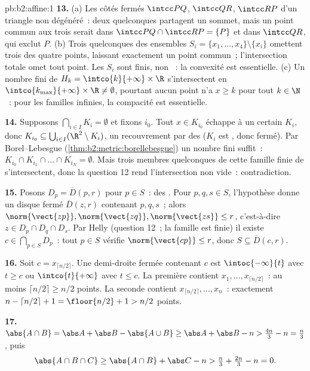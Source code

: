 \begin{solution}{pb:b2:affine:1}
\textbf{13.} (a) Les côtés fermés $\intcc PQ$, $\intcc QR$,
$\intcc RP$ d'un triangle non dégénéré~: deux quelconques partagent un
sommet, mais un point commun aux trois serait dans $\intcc
PQ \cap \intcc RP = \{P\}$ et dans $\intcc QR$, qui exclut
$P$. (b) Trois quelconques des ensembles $S_i = \{x_1, \dots, x_4\}
\setminus \{x_i\}$ omettent trois des quatre points, laissant
exactement un point commun~; l'intersection totale omet tout
point. Les $S_i$ sont finis, non ~: la convexité est
essentielle. (c) Un nombre fini de $H_k = \intco{k}{+\infty} \times
\R$ s'intersectent en $\intco{k_{\max}}{+\infty} \times \R \neq
\emptyset$, pourtant aucun point n'a $x \geq k$ pour tout $k \in \N$~:
pour les familles infinies, la compacité est essentielle.

\textbf{14.} Supposons $\bigcap_{i \in I}K_i = \emptyset$ et
fixons $i_0$. Tout $x \in K_{i_0}$ échappe à un certain $K_i$, donc
$K_{i_0} \subseteq \bigcup_{i \in I}(\R^2 \setminus K_i)$, un
recouvrement par des  ($K_i$ est , donc fermé). Par
Borel--Lebesgue (\cref{thm:b2:metric:borellebesgue}) un nombre fini
suffit~: $K_{i_0} \cap K_{i_1} \cap \dots \cap K_{i_N} =
\emptyset$. Mais trois membres quelconques de cette famille finie de
 s'intersectent, donc la question 12 rend l'intersection
non vide~: contradiction.

\textbf{15.} Posons $D_p = \overline D(p, r)$ pour $p \in S$~:
des  . Pour $p, q, s \in S$, l'hypothèse
donne un disque fermé $\overline D(z, r)$ contenant $p, q, s$~;
alors $\norm{\vect{zp}}, \norm{\vect{zq}}, \norm{\vect{zs}}
\leq r$, c'est-à-dire $z \in D_p \cap D_q \cap D_s$. Par Helly
(question 12~; la famille est finie) il existe $c \in
\bigcap_{p \in S}D_p$~: tout $p \in S$ vérifie
$\norm{\vect{cp}} \leq r$, donc $S \subseteq \overline D(c,
r)$.

\textbf{16.} Soit $c = x_{\lceil n/2\rceil}$. Une demi-droite
fermée contenant $c$ est $\intoc{-\infty}{t}$ avec $t \geq
c$ ou $\intco{t}{+\infty}$ avec $t \leq c$. La première
contient $x_1, \dots, x_{\lceil n/2\rceil}$~: au moins
$\lceil n/2\rceil \geq n/2$ points. La seconde contient
$x_{\lceil n/2\rceil}, \dots, x_n$~: exactement $n - \lceil
n/2\rceil + 1 = \floor{n/2} + 1 > n/2$ points.

\textbf{17.} $\abs{A \cap B} = \abs A + \abs B - \abs{A \cup
B} \geq \abs A + \abs B - n > \tfrac{4n}3 - n = \tfrac n3$,
puis
\[
\abs{A \cap B \cap C} \geq \abs{A \cap B} + \abs C - n >
\tfrac n3 + \tfrac{2n}3 - n = 0 .
\]


\end{solution}
